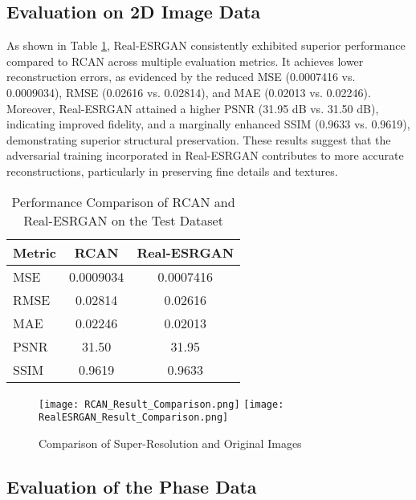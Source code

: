 \documentclass[10pt,twocolumn]{article}
\begin{document}
\subsection{Evaluation on 2D Image Data}

As shown in Table \ref{tab:my_table}, Real-ESRGAN consistently exhibited superior performance compared to RCAN across multiple evaluation metrics. It achieves lower reconstruction errors, as evidenced by the reduced MSE (0.0007416 vs. 0.0009034), RMSE (0.02616 vs. 0.02814), and MAE (0.02013 vs. 0.02246). Moreover, Real-ESRGAN attained a higher PSNR (31.95 dB vs. 31.50 dB), indicating improved fidelity, and a marginally enhanced SSIM (0.9633 vs. 0.9619), demonstrating superior structural preservation. These results suggest that the adversarial training incorporated in Real-ESRGAN contributes to more accurate reconstructions, particularly in preserving fine details and textures.

\begin{table}[ht]
    \caption{Performance Comparison of RCAN and Real-ESRGAN on the Test Dataset}
    \centering
    \vspace{+0.2cm}
    \begin{tabular}{>{\RaggedRight\arraybackslash}p{2.5cm} *{2}{c}}
        \toprule
        \textbf{Metric} & \textbf{RCAN} & \textbf{Real-ESRGAN} \\
        \midrule
        MSE & \num{0.0009034} & \num{0.0007416} \\
        RMSE & \num{0.02814} & \num{0.02616} \\
        MAE & \num{0.02246} & \num{0.02013} \\
        PSNR & \num{31.50} & \num{31.95} \\
        SSIM & \num{0.9619} & \num{0.9633} \\
        \bottomrule
    \end{tabular}
    \label{tab:my_table}
\end{table}


\begin{figure}[ht]
    \centering
    \vspace{-0.3cm}
    \texttt{[image: RCAN\_Result\_Comparison.png]}
    \texttt{[image: RealESRGAN\_Result\_Comparison.png]}
    \vspace{-0.8cm}
    \caption{\centering Comparison of Super-Resolution and Original Images}
    \label{result_comp}
\end{figure}

\subsection{Evaluation of the Phase Data}
\end{document}

